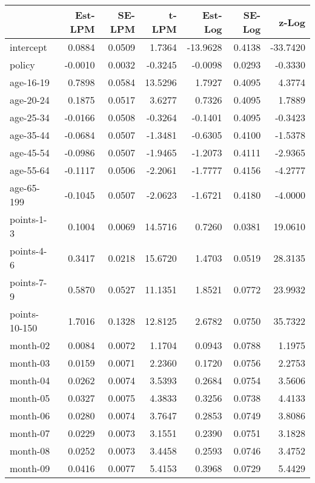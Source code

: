 \documentclass[10pt]{article}
\begin{document}
\begin{table}[ht]
\centering
\begin{tabular}{lrrrrrr}
  \hline
 & Est-LPM & SE-LPM & t-LPM & Est-Log & SE-Log & z-Log \\ 
  \hline
intercept & 0.0884 & 0.0509 & 1.7364 & -13.9628 & 0.4138 & -33.7420 \\ 
  policy & -0.0010 & 0.0032 & -0.3245 & -0.0098 & 0.0293 & -0.3330 \\ 
  age-16-19 & 0.7898 & 0.0584 & 13.5296 & 1.7927 & 0.4095 & 4.3774 \\ 
  age-20-24 & 0.1875 & 0.0517 & 3.6277 & 0.7326 & 0.4095 & 1.7889 \\ 
  age-25-34 & -0.0166 & 0.0508 & -0.3264 & -0.1401 & 0.4095 & -0.3423 \\ 
  age-35-44 & -0.0684 & 0.0507 & -1.3481 & -0.6305 & 0.4100 & -1.5378 \\ 
  age-45-54 & -0.0986 & 0.0507 & -1.9465 & -1.2073 & 0.4111 & -2.9365 \\ 
  age-55-64 & -0.1117 & 0.0506 & -2.2061 & -1.7777 & 0.4156 & -4.2777 \\ 
  age-65-199 & -0.1045 & 0.0507 & -2.0623 & -1.6721 & 0.4180 & -4.0000 \\ 
  points-1-3 & 0.1004 & 0.0069 & 14.5716 & 0.7260 & 0.0381 & 19.0610 \\ 
  points-4-6 & 0.3417 & 0.0218 & 15.6720 & 1.4703 & 0.0519 & 28.3135 \\ 
  points-7-9 & 0.5870 & 0.0527 & 11.1351 & 1.8521 & 0.0772 & 23.9932 \\ 
  points-10-150 & 1.7016 & 0.1328 & 12.8125 & 2.6782 & 0.0750 & 35.7322 \\ 
  month-02 & 0.0084 & 0.0072 & 1.1704 & 0.0943 & 0.0788 & 1.1975 \\ 
  month-03 & 0.0159 & 0.0071 & 2.2360 & 0.1720 & 0.0756 & 2.2753 \\ 
  month-04 & 0.0262 & 0.0074 & 3.5393 & 0.2684 & 0.0754 & 3.5606 \\ 
  month-05 & 0.0327 & 0.0075 & 4.3833 & 0.3256 & 0.0738 & 4.4133 \\ 
  month-06 & 0.0280 & 0.0074 & 3.7647 & 0.2853 & 0.0749 & 3.8086 \\ 
  month-07 & 0.0229 & 0.0073 & 3.1551 & 0.2390 & 0.0751 & 3.1828 \\ 
  month-08 & 0.0252 & 0.0073 & 3.4458 & 0.2593 & 0.0746 & 3.4752 \\ 
  month-09 & 0.0416 & 0.0077 & 5.4153 & 0.3968 & 0.0729 & 5.4429 \\ 

\end{tabular}
\end{table}
\end{document}
